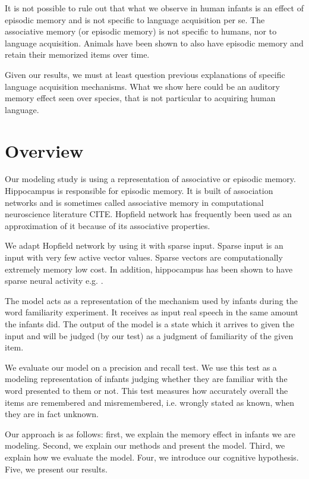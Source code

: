 \documentclass{article}
\begin{document}
It is not possible to rule out that what we observe in human infants is an effect of episodic memory and is not specific to language acquisition per se. The associative memory (or episodic memory) is not specific to humans, nor to language acquisition. Animals have been shown to also have episodic memory and retain their memorized items over time.

Given our results, we must at least question previous explanations of specific language acquisition mechanisms. What we show here could be an auditory memory effect seen over species, that is not particular to acquiring human language.

\section{Overview}

Our modeling study is using a representation of associative or episodic memory. Hippocampus is responsible for episodic memory. \cite{rolls} It is built of association networks and is sometimes called associative memory in computational neuroscience literature CITE. Hopfield network has frequently been used as an approximation of it because of its associative properties.

We adapt Hopfield network by using it with sparse input. Sparse input is an input with very few active vector values. Sparse vectors are computationally extremely memory low cost. In addition, hippocampus has been shown to have sparse neural activity e.g. \cite{karlsson2008network, guzman2016synaptic}.

The model acts as a representation of the mechanism used by infants during the word familiarity experiment. It receives as input real speech in the same amount the infants did. The output of the model is a state which it arrives to given the input and will be judged (by our test) as a judgment of familiarity of the given item.

We evaluate our model on a precision and recall test. We use this test as a modeling representation of infants judging whether they are familiar with the word presented to them or not. This test measures how accurately overall the items are remembered and misremembered, i.e. wrongly stated as known, when they are in fact unknown.

Our approach is as follows: first, we explain the memory effect in infants we are modeling. Second, we explain our methods and present the model. Third, we explain how we evaluate the model. Four, we introduce our cognitive hypothesis. Five, we present our results.
\end{document}

